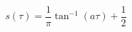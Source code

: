 \begin{equation}
s(\tau) = \frac{1}{\pi}\tan^{-1}(a\tau) + \frac{1}{2}
\label{eq:arctan_step}
\end{equation}
